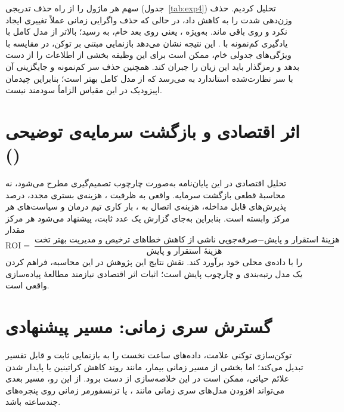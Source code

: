 سهم هر ماژول را از راه حذف تدریجی  (جدول~\ref{tab:exp4}) تحلیل کردیم. حذف وزن‌دهی شدت  را به  کاهش داد، در حالی که حذف واگرایی زمانی عملاً تغییری ایجاد نکرد و روی  باقی ماند. به‌ویژه \textbf{\texttt{}}، یعنی  روی  بعد خام، به   رسید؛ بالاتر از مدل کامل  با یادگیری کم‌نمونه با . این نتیجه نشان می‌دهد بازنمایی مبتنی بر توکن، در مقایسه با ویژگی‌های جدولی خام، ممکن است برای این وظیفه بخشی از اطلاعات را از دست بدهد و رمزگذار  باید این زیان را جبران کند. همچنین حذف سر کم‌نمونه و جایگزینی آن با سر نظارت‌شده استاندارد به   می‌رسد که از مدل کامل بهتر است؛ بنابراین چیدمان اپیزودیک در این مقیاس الزاماً سودمند نیست.

\section{\texorpdfstring{اثر اقتصادی و بازگشت سرمایه‌ی توضیحی ()}{اثر اقتصادی و بازگشت سرمایه توضیحی (ROI)}}

تحلیل اقتصادی در این پایان‌نامه به‌صورت چارچوب تصمیم‌گیری مطرح می‌شود، نه محاسبۀ قطعی بازگشت سرمایه.  واقعی به ظرفیت ، هزینه‌ی بستری مجدد، درصد پذیرش‌های قابل مداخله، هزینه‌ی اتصال به ، بار کاری تیم درمان و سیاست‌های هر مرکز وابسته است. بنابراین به‌جای گزارش یک عدد ثابت، پیشنهاد می‌شود هر مرکز مقدار
\[
\mathrm{ROI}=\frac{\text{صرفه‌جویی ناشی از کاهش خطاهای ترخیص و مدیریت بهتر تخت}-\text{هزینۀ استقرار و پایش}}{\text{هزینۀ استقرار و پایش}}
\]
را با داده‌ی محلی خود برآورد کند. نقش نتایج این پژوهش در این محاسبه، فراهم کردن یک مدل رتبه‌بندی و چارچوب پایش است؛ اثبات اثر اقتصادی نیازمند مطالعۀ پیاده‌سازی واقعی است.

\section{گسترش سری زمانی: مسیر پیشنهادی}

توکن‌سازی توکنی علامت، داده‌های  ساعت نخست را به بازنمایی ثابت و قابل تفسیر تبدیل می‌کند؛ اما بخشی از مسیر زمانی بیمار، مانند روند کاهش کراتینین یا پایدار شدن علائم حیاتی، ممکن است در این خلاصه‌سازی از دست برود. از این رو، مسیر بعدی می‌تواند افزودن مدل‌های سری زمانی مانند ،  یا ترنسفورمر زمانی روی پنجره‌های چندساعته باشد.

